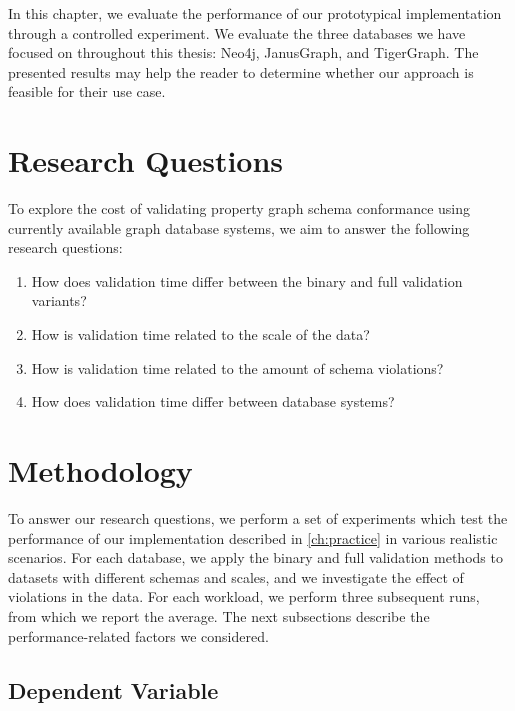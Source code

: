 \documentclass{report}
\theoremstyle{definition}
\begin{document}
In this chapter, we evaluate the performance of our prototypical implementation through a controlled experiment. We evaluate the three databases we have focused on throughout this thesis: Neo4j, JanusGraph, and TigerGraph. The presented results may help the reader to determine whether our approach is feasible for their use case.

\section{Research Questions}

To explore the cost of validating property graph schema conformance using currently available graph database systems, we aim to answer the following research questions:

\begin{enumerate}[label=\bfseries RQ\arabic*,ref=RQ\arabic*]
  \item\label{rq:variant} How does validation time differ between the binary and full validation variants?
  \item\label{rq:scale} How is validation time related to the scale of the data?
  \item\label{rq:violations} How is validation time related to the amount of schema violations?
  \item\label{rq:database} How does validation time differ between database systems?
\end{enumerate}

\section{Methodology}

To answer our research questions, we perform a set of experiments which test the performance of our implementation described in \autoref{ch:practice} in various realistic scenarios. For each database, we apply the binary and full validation methods to datasets with different schemas and scales, and we investigate the effect of violations in the data. For each workload, we perform three subsequent runs, from which we report the average. The next subsections describe the performance-related factors we considered.

\subsection{Dependent Variable}
\end{document}
